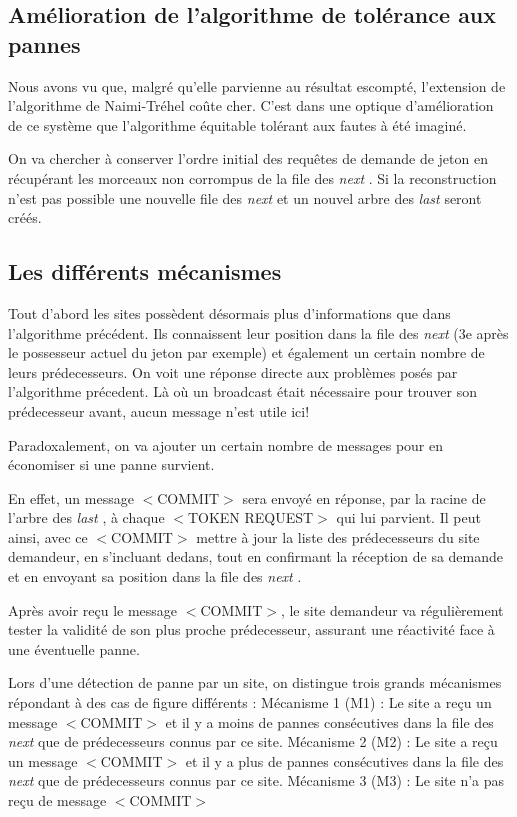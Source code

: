\documentclass[a4paper,12pt]{report}
\newcommand{\nt}{Naimi-Tréhel }
\newcommand{\last}{\textit{last} }
\newcommand{\next}{\textit{next} }
\begin{document}
\subsection*{Amélioration de l'algorithme de tolérance aux pannes}
Nous avons vu que, malgré qu'elle parvienne au résultat escompté, l'extension de l'algorithme de \nt coûte cher. C'est dans une optique d'amélioration de ce système que l'algorithme équitable tolérant aux fautes à été imaginé.

On va chercher à conserver l'ordre initial des requêtes de demande de jeton en récupérant les morceaux non corrompus de la file des \next. Si la reconstruction n'est pas possible une nouvelle file des \next et un nouvel arbre des \last seront créés.

\subsection*{Les différents mécanismes}
Tout d'abord les sites possèdent désormais plus d'informations que dans l'algorithme précédent. Ils connaissent leur position dans la file des \next (3e après le possesseur actuel du jeton par exemple) et également un certain nombre de leurs prédecesseurs. On voit une réponse directe aux problèmes posés par l'algorithme précedent. Là où un broadcast était nécessaire pour trouver son prédecesseur avant, aucun message n'est utile ici! 

Paradoxalement, on va ajouter un certain nombre de messages pour en économiser si une panne survient.

En effet, un message $<$COMMIT$>$ sera envoyé en réponse, par la racine de l'arbre des \last, à chaque $<$TOKEN REQUEST$>$ qui lui parvient. Il peut ainsi, avec ce $<$COMMIT$>$ mettre à jour la liste des prédecesseurs du site demandeur, en s'incluant dedans, tout en confirmant la réception de sa demande et en envoyant sa position dans la file des \next.

Après avoir reçu le message $<$COMMIT$>$, le site demandeur va régulièrement tester la validité de son plus proche prédecesseur, assurant une réactivité face à une éventuelle panne.


Lors d'une détection de panne par un site, on distingue trois grands mécanismes répondant à des cas de figure différents : 
Mécanisme 1 (M1) : Le site a reçu un message $<$COMMIT$>$ et il y a moins de pannes consécutives dans la file des \next que de prédecesseurs connus par ce site. 
Mécanisme 2 (M2) : Le site a reçu un message $<$COMMIT$>$ et il y a plus de pannes consécutives dans la file des \next que de prédecesseurs connus par ce site.
Mécanisme 3 (M3) : Le site n'a pas reçu de message $<$COMMIT$>$
\end{document}
